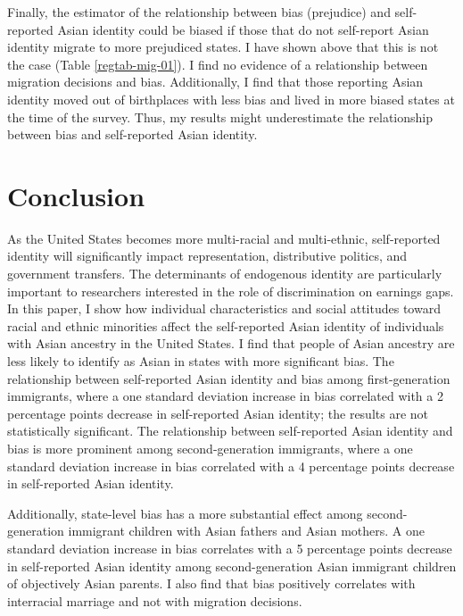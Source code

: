 Finally, the estimator of the relationship between bias (prejudice) and self-reported Asian identity could be biased if those that do not self-report Asian identity migrate to more prejudiced states. I have shown above that this is not the case (Table \ref{regtab-mig-01}). I find no evidence of a relationship between migration decisions and bias. Additionally, I find that those reporting Asian identity moved out of birthplaces with less bias and lived in more biased states at the time of the survey. Thus, my results might underestimate the relationship between bias and self-reported Asian identity.

\section{Conclusion}\label{sec:conc}

As the United States becomes more multi-racial and multi-ethnic, self-reported identity will significantly impact representation, distributive politics, and government transfers. The determinants of endogenous identity are particularly important to researchers interested in the role of discrimination on earnings gaps. In this paper, I show how individual characteristics and social attitudes toward racial and ethnic minorities affect the self-reported Asian identity of individuals with Asian ancestry in the United States. I find that people of Asian ancestry are less likely to identify as Asian in states with more significant bias. The relationship between self-reported Asian identity and bias among first-generation immigrants, where a one standard deviation increase in bias correlated with a 2 percentage points decrease in self-reported Asian identity; the results are not statistically significant. The relationship between self-reported Asian identity and bias is more prominent among second-generation immigrants, where a one standard deviation increase in bias correlated with a 4 percentage points decrease in self-reported Asian identity. 

Additionally, state-level bias has a more substantial effect among second-generation immigrant children with Asian fathers and Asian mothers. A one standard deviation increase in bias correlates with a 5 percentage points decrease in self-reported Asian identity among second-generation Asian immigrant children of objectively Asian parents. I also find that bias positively correlates with interracial marriage and not with migration decisions.

